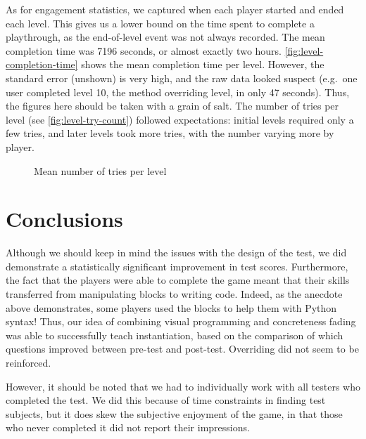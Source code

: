 \documentclass[12pt,notitlepage]{article}
\begin{document}
As for engagement statistics, we captured when each player started and
ended each level. This gives us a lower bound on the time spent to
complete a playthrough, as the end-of-level event was not always
recorded. The mean completion time was 7196 seconds, or almost exactly
two hours. \autoref{fig:level-completion-time} shows the mean
completion time per level. However, the standard error (unshown) is
very high, and the raw data looked suspect (e.g.\ one user completed
level 10, the method overriding level, in only 47 seconds). Thus, the
figures here should be taken with a grain of salt. The number of tries
per level (see \autoref{fig:level-try-count}) followed expectations:
initial levels required only a few tries, and later levels took more
tries, with the number varying more by player.

\begin{figure}
  \centering
  \caption{Mean number of tries per level}\label{fig:level-try-count}
\end{figure}

\section{Conclusions}

Although we should keep in mind the issues with the design of the
test, we did demonstrate a statistically significant improvement in
test scores. Furthermore, the fact that the players were able to
complete the game meant that their skills transferred from
manipulating blocks to writing code. Indeed, as the anecdote above
demonstrates, some players used the blocks to help them with Python
syntax! Thus, our idea of combining visual programming and
concreteness fading was able to successfully teach instantiation,
based on the comparison of which questions improved between pre-test
and post-test. Overriding did not seem to be reinforced.

However, it should be noted that we had to individually work with all
testers who completed the test. We did this because of time
constraints in finding test subjects, but it does skew the subjective
enjoyment of the game, in that those who never completed it did not
report their impressions.
\end{document}

